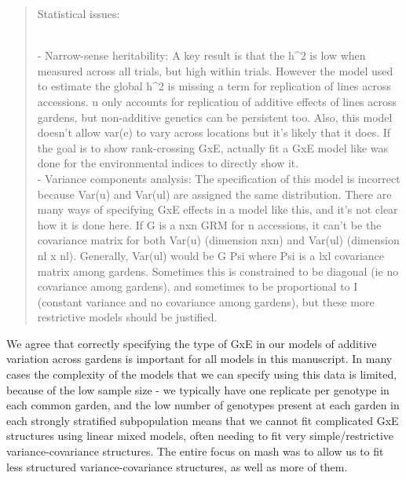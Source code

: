 \documentclass[
  letterpaper,
  DIV=11,
  numbers=noendperiod]{scrartcl}
\begin{document}
\begin{quote}
\begin{tcolorbox}[enhanced jigsaw, colframe=quarto-callout-warning-color-frame, rightrule=.15mm, leftrule=.75mm, left=2mm, breakable, toprule=.15mm, arc=.35mm, bottomrule=.15mm, opacityback=0, colback=white]

Statistical issues:\\
\strut \\
- Narrow-sense heritability: A key result is that the h\^{}2 is low when
measured across all trials, but high within trials. However the model
used to estimate the global h\^{}2 is missing a term for replication of
lines across accessions. u only accounts for replication of additive
effects of lines across gardens, but non-additive genetics can be
persistent too. Also, this model doesn't allow var(e) to vary across
locations but it's likely that it does. If the goal is to show
rank-crossing GxE, actually fit a GxE model like was done for the
environmental indices to directly show it.\\
- Variance components analysis: The specification of this model is
incorrect because Var(u) and Var(ul) are assigned the same distribution.
There are many ways of specifying GxE effects in a model like this, and
it's not clear how it is done here. If G is a nxn GRM for n accessions,
it can't be the covariance matrix for both Var(u) (dimension nxn) and
Var(ul) (dimension nl x nl). Generally, Var(ul) would be G \otimes Psi
where Psi is a lxl covariance matrix among gardens. Sometimes this is
constrained to be diagonal (ie no covariance among gardens), and
sometimes to be proportional to I (constant variance and no covariance
among gardens), but these more restrictive models should be justified.

\end{tcolorbox}
\end{quote}

We agree that correctly specifying the type of GxE in our models of
additive variation across gardens is important for all models in this
manuscript. In many cases the complexity of the models that we can
specify using this data is limited, because of the low sample size - we
typically have one replicate per genotype in each common garden, and the
low number of genotypes present at each garden in each strongly
stratified subpopulation means that we cannot fit complicated GxE
structures using linear mixed models, often needing to fit very
simple/restrictive variance-covariance structures. The entire focus on
mash was to allow us to fit less structured variance-covariance
structures, as well as more of them.
\end{document}
